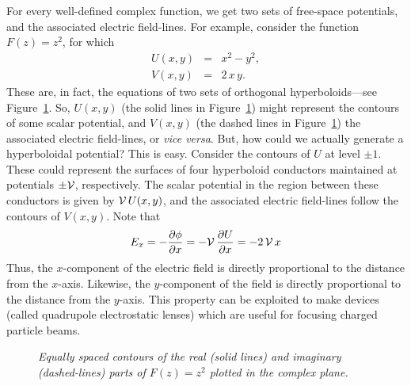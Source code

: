 For every well-defined complex function, we get two sets
of free-space potentials, and the associated electric field-lines. For example,
consider the function  $F(z) = z^2$, for which
\begin{eqnarray}
U(x,y)&=& x^2 - y^2,\\[0.5ex]
V(x,y) &=& 2\,x\,y.
\end{eqnarray}
These are, in fact, the equations of two sets of orthogonal hyperboloids---see Figure~\ref{ff5}.
So, $U(x,y)$ (the solid lines in Figure~\ref{ff5}) 
might represent the contours of some scalar potential, and $V(x,y)$
(the dashed lines in Figure~\ref{ff5})
the associated electric field-lines, or {\em vice versa}. But, how could we
actually generate a hyperboloidal potential? This is easy. Consider the contours
of $U$ at level $\pm 1$. These could represent the surfaces of four hyperboloid
conductors maintained at potentials $\pm \cal V$, respectively. The scalar potential in the
region between these conductors is given by ${\cal V}\, U(x, y)$, and the associated
electric field-lines follow the contours of $V(x, y)$. 
Note that 
\begin{equation}
E_x = - \frac{\partial\phi}{\partial x} =- {\cal V} \,\frac{\partial U}{\partial x}
= -2 \,{\cal V}\, x
\end{equation}
Thus, the $x$-component of the electric 
field is directly proportional to the distance
from the $x$-axis. Likewise,  the  $y$-component of the field is directly proportional
to the distance from the $y$-axis. This property
can be exploited to make devices (called quadrupole electrostatic lenses) which
are useful for focusing charged particle beams.
\begin{figure}
\epsfysize=3in
\centerline{}
\caption{\em Equally spaced contours of the real (solid lines) and imaginary (dashed-lines) parts of $F(z)=z^2$ plotted in the complex plane. }\label{ff5}
\end{figure}

